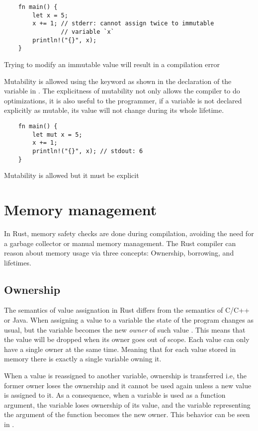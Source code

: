 \begin{listing}[h]
	\begin{verbatim}
    fn main() {
        let x = 5;
        x += 1; // stderr: cannot assign twice to immutable 
                // variable `x`
        println!("{}", x);
    }
	\end{verbatim}
  \caption{Trying to modify an immutable value will result in a compilation error}
  \label{lst:immutable}
\end{listing}

Mutability is allowed using the  keyword as shown in the
declaration of the variable  in . The explicitness
of mutability not only allows the compiler to do optimizations, it is also
useful to the programmer, if a variable is not declared explicitly as mutable,
its value will not change during its whole lifetime.

\begin{listing}[h]
	\begin{verbatim}
    fn main() {
        let mut x = 5;
        x += 1;
        println!("{}", x); // stdout: 6 
    }
	\end{verbatim}
  \caption{Mutability is allowed but it must be explicit}
  \label{lst:mutable}
\end{listing}

\section{Memory management}
In Rust, memory safety checks are done during compilation, avoiding the need for
a garbage collector or manual memory management. The Rust compiler can reason
about memory usage via three concepts: Ownership, borrowing, and lifetimes.

\subsection{Ownership}
The semantics of value assignation in Rust differs from the semantics of C/C++
or Java. When assigning a value to a variable the state of the program changes
as usual, but the variable becomes the new \textit{owner} of such value
\cite{ownership_types}. This means that the value will be dropped when its
owner goes out of scope. Each value can only have a single owner at the same
time.  Meaning that for each value stored in memory there is exactly a single
variable owning it. 

When a value is reassigned to another variable, ownership is transferred i.e,
the former owner loses the ownership and it cannot be used again unless a new
value is assigned to it. As a consequence, when a variable is used as a function
argument, the variable loses ownership of its value, and the variable
representing the argument of the function becomes the new owner. This behavior
can be seen in .

